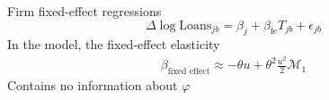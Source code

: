 \documentclass[english,xcolor=svgnames]{beamer}
\begin{document}

\begin{frame}{Firm fixed-effect regressions}
$$\Delta \log \text{Loans}_{jb} = \beta_j + \beta_{\text{fe}} T_{jb} + \epsilon_{jb}$$
In the model, the fixed-effect elasticity
\begin{align}
\beta_{\text{fixed effect}} \approx - \theta u + \theta^2 \frac{u^2}{2} \mathcal{M}_1
\end{align}
Contains no information about $\varphi$
\end{frame}
\end{document}
